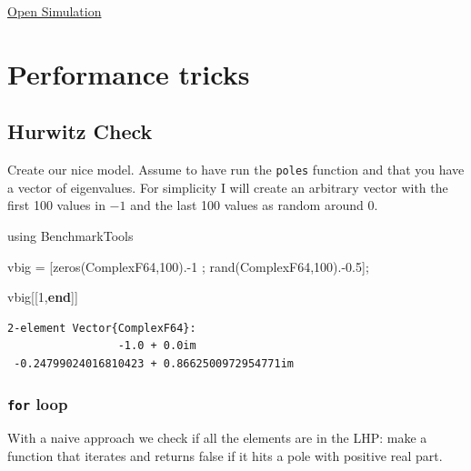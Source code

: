 \documentclass[
  8pt,
  a4paper,
]{book}
\newenvironment{Shaded}{\begin{snugshade}}{\end{snugshade}}
\newcommand{\BuiltInTok}[1]{\textcolor[rgb]{0.00,0.23,0.31}{#1}}
\newcommand{\DataTypeTok}[1]{\textcolor[rgb]{0.68,0.00,0.00}{#1}}
\newcommand{\FloatTok}[1]{\textcolor[rgb]{0.68,0.00,0.00}{#1}}
\newcommand{\FunctionTok}[1]{\textcolor[rgb]{0.28,0.35,0.67}{#1}}
\newcommand{\ImportTok}[1]{\textcolor[rgb]{0.00,0.46,0.62}{#1}}
\newcommand{\KeywordTok}[1]{\textcolor[rgb]{0.00,0.23,0.31}{\textbf{#1}}}
\newcommand{\NormalTok}[1]{\textcolor[rgb]{0.00,0.23,0.31}{#1}}
\newcommand{\OperatorTok}[1]{\textcolor[rgb]{0.37,0.37,0.37}{#1}}
\begin{document}
\href{https://pages.icpmol.es/ControlChallenges/index.html?target=TutorialBlockWithFriction&code=bGV0IEtwID0gMzM3OwpsZXQgS2QgPSA2NDsKZnVuY3Rpb24gY29udHJvbEZ1bmN0aW9uKGJsb2NrKQp7CiAgcmV0dXJuIC0oIGJsb2NrLnggKiBLcCArIGJsb2NrLmR4KktkKTsKfQ==}{Open Simulation}

\cleardoublepage
{}
{}
\appendix

\chapter{Performance tricks}\label{performance-tricks}

\section{Hurwitz Check}\label{hurwitz-check}

Create our nice model. Assume to have run the \texttt{poles} function
and that you have a vector of eigenvalues. For simplicity I will create
an arbitrary vector with the first 100 values in \(-1\) and the last 100
values as random around \(0\).

\begin{Shaded}
\begin{Highlighting}[]
\ImportTok{using} \BuiltInTok{BenchmarkTools}

\NormalTok{vbig }\OperatorTok{=}\NormalTok{ [}\FunctionTok{zeros}\NormalTok{(}\DataTypeTok{ComplexF64}\NormalTok{,}\FloatTok{100}\NormalTok{)}\OperatorTok{.{-}}\FloatTok{1}\NormalTok{ ; }\FunctionTok{rand}\NormalTok{(}\DataTypeTok{ComplexF64}\NormalTok{,}\FloatTok{100}\NormalTok{)}\OperatorTok{.{-}}\FloatTok{0.5}\NormalTok{];}

\NormalTok{vbig[[}\FloatTok{1}\NormalTok{,}\KeywordTok{end}\NormalTok{]]}
\end{Highlighting}
\end{Shaded}

\begin{verbatim}
2-element Vector{ComplexF64}:
                 -1.0 + 0.0im
 -0.24799024016810423 + 0.8662500972954771im
\end{verbatim}

\subsection{\texorpdfstring{\texttt{for}
loop}{for loop}}\label{for-loop}

With a naive approach we check if all the elements are in the LHP: make
a function that iterates and returns false if it hits a pole with
positive real part.
\end{document}
